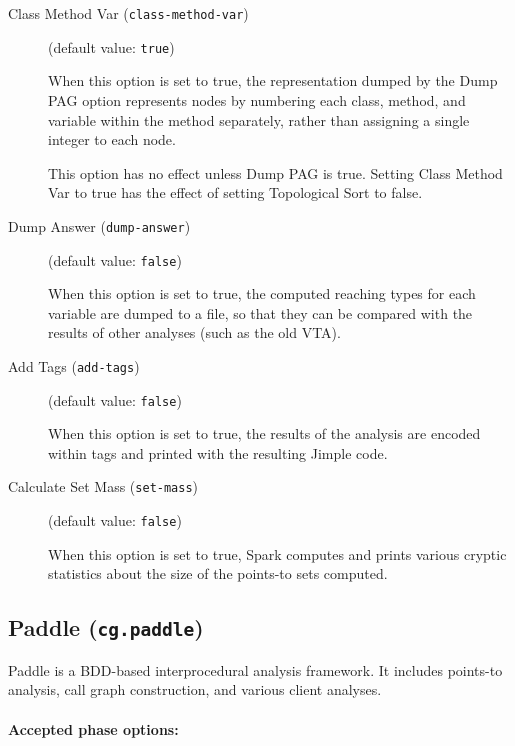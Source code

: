 \documentclass{article}
\begin{document}
\begin{description}
\item[Class Method Var ({\tt class-method-var})]
(default value: {\tt true})




When this option is set to true, the representation dumped by the
Dump PAG option
represents nodes by numbering each class, method, and variable within
the method separately, rather than assigning a single integer to each
node.

This option has no effect unless Dump PAG is true.  Setting Class
Method Var to true has the effect of setting Topological Sort to
false.
        


\item[Dump Answer ({\tt dump-answer})]
(default value: {\tt false})




When this option is set to true, the computed reaching types for each variable are
dumped to a file, so that they can be compared with the results of
other analyses (such as the old VTA).
        


\item[Add Tags ({\tt add-tags})]
(default value: {\tt false})




        When this option is set to true, the results of the analysis are encoded within
tags and printed with the resulting Jimple code.

        


\item[Calculate Set Mass ({\tt set-mass})]
(default value: {\tt false})




When this option is set to true, Spark computes and prints various
cryptic statistics about the size of the points-to sets computed.
        


\end{description}

\subsection{Paddle ({\tt cg.paddle})}
Paddle is a BDD-based interprocedural analysis framework. It includes points-to analysis, call graph construction, and various client analyses.

\paragraph{Accepted phase options:} 
\end{document}
